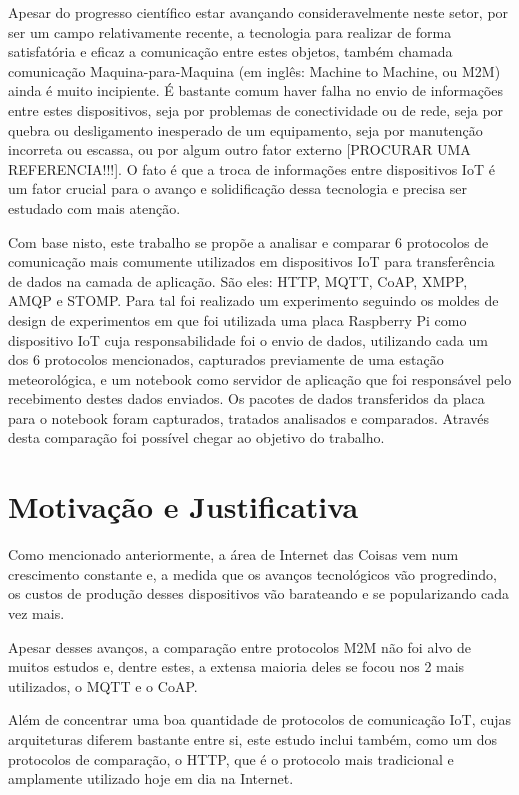 Apesar do progresso científico estar avançando consideravelmente neste setor, por ser um campo relativamente recente, a tecnologia para realizar de forma satisfatória e eficaz a comunicação entre estes objetos, também chamada comunicação Maquina-para-Maquina (em inglês: Machine to Machine, ou M2M) ainda é muito incipiente. É bastante comum haver falha no envio de informações entre estes dispositivos, seja por problemas de conectividade ou de rede, seja por quebra ou desligamento inesperado de um equipamento, seja por manutenção incorreta ou escassa, ou por algum outro fator externo [PROCURAR UMA REFERENCIA!!!]. O fato é que a troca de informações entre dispositivos IoT é um fator crucial para o avanço e solidificação dessa tecnologia e precisa ser estudado com mais atenção. 

Com base nisto, este trabalho se propõe a analisar e comparar 6 protocolos de comunicação mais comumente utilizados em dispositivos IoT para transferência de dados na camada de aplicação. São eles: HTTP, MQTT, CoAP, XMPP, AMQP e STOMP. Para tal foi realizado um experimento seguindo os moldes de design de experimentos em que foi utilizada uma placa Raspberry Pi como dispositivo IoT cuja responsabilidade foi o envio de dados, utilizando cada um dos 6 protocolos mencionados, capturados previamente de uma estação meteorológica, e um notebook como servidor de aplicação que foi responsável pelo recebimento destes dados enviados. Os pacotes de dados transferidos da placa para o notebook foram capturados, tratados analisados e comparados. Através desta comparação foi possível chegar ao objetivo do trabalho.


\section{Motivação e Justificativa}

Como mencionado anteriormente, a área de Internet das Coisas vem num crescimento constante e, a medida que os avanços tecnológicos vão progredindo, os custos de produção desses dispositivos vão barateando e se popularizando cada vez mais.  

Apesar desses avanços, a comparação entre protocolos M2M não foi alvo de muitos estudos e, dentre estes, a extensa maioria deles se focou nos 2 mais utilizados, o MQTT e o CoAP.

Além de concentrar uma boa quantidade de protocolos de comunicação IoT, cujas arquiteturas diferem bastante entre si, este estudo inclui também, como um dos protocolos de comparação, o HTTP, que é o protocolo mais tradicional e amplamente utilizado hoje em dia na Internet.


